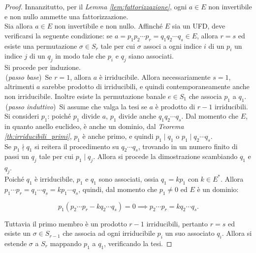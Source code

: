 \begin{proof}
    Innanzitutto, per il \textit{Lemma \ref{lem:fattorizzazione}}, ogni
    $a \in E$ non invertibile e non nullo ammette una fattorizzazione. \\

    Sia allora $a \in E$ non invertibile e non nullo. Affinché $E$ sia un UFD,
    deve verificarsi la seguente condizione: se
    $a=p_1p_2 \cdots p_r=q_1q_2 \cdots q_s \in E$, allora
    $r=s$ ed esiste una permutazione $\sigma \in S_r$ tale per cui
    $\sigma$ associ a ogni indice $i$ di un $p_i$ un indice $j$ di
    un $q_j$ in modo tale che $p_i$ e $q_j$ siano associati. \\

    Si procede per induzione. \\

    \,(\textit{passo base}) \,Se $r=1$, allora $a$ è irriducibile. Allora necessariamente
    $s=1$, altrimenti $a$ sarebbe prodotto di irriducibili, e quindi contemporaneamente
    anche non irriducibile. Inoltre esiste la permutazione banale $e \in S_1$ che
    associa $p_1$ a $q_1$. \\

    \,(\textit{passo induttivo}) \,Si assume che valga la tesi se $a$ è
    prodotto di $r-1$ irriducibili.
    Si consideri $p_1$: poiché $p_1$ divide $a$, $p_1$ divide anche
    $q_1q_2 \cdots q_s$. Dal momento che $E$, in quanto
    anello euclideo, è anche un dominio, dal \textit{Teorema \ref{th:irriducibili_primi}}, $p_1$ è anche primo,
    e quindi $p_1 \mid q_1$ o $p_1 \mid q_2 \cdots q_s$. \\

    Se $p_1 \nmid q_1$ si reitera il procedimento su $q_2 \cdots q_s$, trovando in
    un numero finito di passi un $q_j$ tale per cui $p_1 \mid q_j$. Allora si procede
    la dimostrazione scambiando $q_1$ e $q_j$. \\

    Poiché $q_1$ è irriducibile, $p_1$ e $q_1$ sono associati, ossia $q_1 = kp_1$ con
    $k \in E^*$. Allora $p_1 \cdots p_r = q_1 \cdots q_s = kp_1 \cdots q_s$, quindi,
    dal momento che $p_1 \neq 0$ ed $E$ è un dominio:

    \[p_1(p_2 \cdots p_r - kq_2 \cdots q_s)=0 \implies p_2 \cdots p_r = kq_2 \cdots q_s .\]

    Tuttavia il primo membro è un prodotto $r-1$ irriducibili, pertanto $r=s$ ed
    esiste un $\sigma \in S_{r-1}$ che associa ad ogni irriducibile $p_i$ un suo
    associato $q_i$. Allora si estende $\sigma$ a $S_r$ mappando $p_1$ a $q_1$,
    verificando la tesi.
\end{proof}

